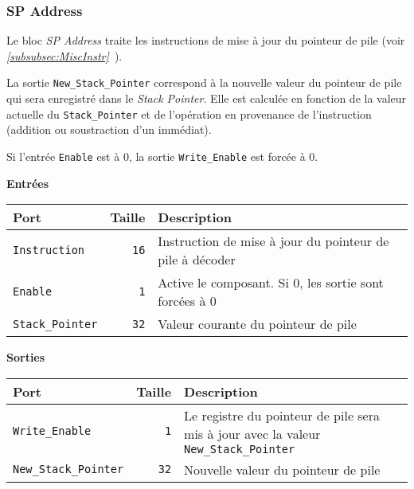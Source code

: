 \documentclass{article}
\begin{document}
    \subsubsection{SP Address}
    \label{sec:SPAddr}

    Le bloc \textit{SP Address} traite les instructions de mise à jour du pointeur de pile (voir \textit{\ref{subsubsec:MiscInstr}~}).

    La sortie \texttt{New\_Stack\_Pointer} correspond à la nouvelle valeur du pointeur de pile qui sera enregistré dans le \textit{Stack Pointer}.
    Elle est calculée en fonction de la valeur actuelle du \texttt{Stack\_Pointer} et de l'opération en provenance de l'instruction (addition ou soustraction d'un immédiat).

    Si l'entrée \texttt{Enable} est à 0, la sortie \texttt{Write\_Enable} est forcée à 0.


    \textbf{Entrées}\\

    \begin{tabular}{|l|r|l|}
        \hline
        \textbf{Port}           & \textbf{Taille} & \textbf{Description}                                     \\
        \hline

        \texttt{Instruction}    & \texttt{16}     & Instruction de mise à jour du pointeur de pile à décoder \\
        \hline
        \texttt{Enable} & \texttt{1} & Active le composant.
        Si 0, les sortie sont forcées à 0 \\
        \hline
        \texttt{Stack\_Pointer} & \texttt{32}     & Valeur courante du pointeur de pile                      \\

        \hline
    \end{tabular}

    \vspace{1em}
    \textbf{Sorties}\\

    \begin{tabular}{|l|r|l|}
        \hline
        \textbf{Port}                & \textbf{Taille} & \textbf{Description}                                                                        \\
        \hline

        \hline
        \texttt{Write\_Enable}       & \texttt{1}      & Le registre du pointeur de pile sera mis à jour avec la valeur \texttt{New\_Stack\_Pointer} \\
        \hline
        \texttt{New\_Stack\_Pointer} & \texttt{32}     & Nouvelle valeur du pointeur de pile                                                         \\

        \hline
    \end{tabular}
\end{document}
